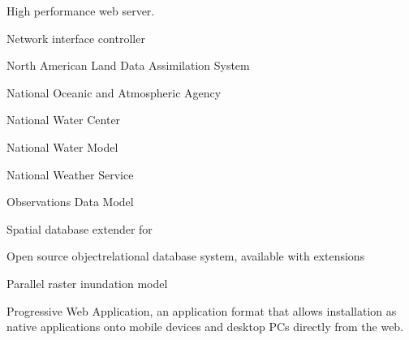 \documentclass[letterpaper,12pt,english,openany,oneside]{sphinxmanual}
\begin{document}
\begin{description}
\sphinxAtStartPar
High performance web server.

\sphinxAtStartPar
Network interface controller

\sphinxAtStartPar
North American Land Data Assimilation System

\sphinxAtStartPar
National Oceanic and Atmospheric Agency

\sphinxAtStartPar
National Water Center

\sphinxAtStartPar
National Water Model

\sphinxAtStartPar
National Weather Service

\sphinxAtStartPar
Observations Data Model

\sphinxAtStartPar
Spatial database extender for {\hyperref[\detokenize{glossary:term-PostgreSQL}]{}}

\sphinxAtStartPar
Open source object\sphinxhyphen{}relational database system, available with {\hyperref[\detokenize{glossary:term-PostGIS}]{}} extensions

\sphinxAtStartPar
Parallel raster inundation model

\sphinxAtStartPar
Progressive Web Application, an application format that allows installation as native applications onto mobile devices and desktop PCs directly from the web.


\end{description}
\end{document}
